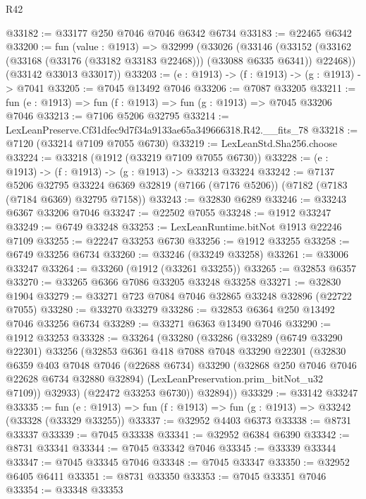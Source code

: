 \begin{lexlean}{R42}
\begin{coremodule}
{@33182 := @33177 @250 @7046 @7046 @6342 @6734
@33183 := @22465 @6342
@33200 := fun (value : @1913) =>
  @32999
    (@33026
      (@33146
        (@33152 (@33162 (@33168 (@33176 (@33182 @33183 @22468))) (@33088 @6335 @6341)) @22468))
      (@33142 @33013 @33017))
@33203 := (e : @1913) -> (f : @1913) -> (g : @1913) -> @7041
@33205 := @7045 @13492 @7046
@33206 := @7087 @33205
@33211 := fun (e : @1913) => fun (f : @1913) => fun (g : @1913) => @7045 @33206 @7046
@33213 := @7106 @5206 @32795
@33214 := LexLeanPreserve.Cf31dfec9d7f34a9133ae65a349666318.R42.__fits_78
@33218 := @7120 (@33214 @7109 @7055 @6730)
@33219 := LexLeanStd.Sha256.choose
@33224 := @33218 (@1912 (@33219 @7109 @7055 @6730))
@33228 := (e : @1913) -> (f : @1913) -> (g : @1913) -> @33213 @33224
@33242 := @7137
    @5206
    @32795
    @33224
    @6369
    @32819
    (@7166 (@7176 @5206))
    (@7182 (@7183 (@7184 @6369) @32795 @7158))
@33243 := @32830 @6289
@33246 := @33243 @6367 @33206 @7046
@33247 := @22502 @7055
@33248 := @1912 @33247
@33249 := @6749 @33248
@33253 := LexLeanRuntime.bitNot @1913 @22246 @7109
@33255 := @22247 @33253 @6730
@33256 := @1912 @33255
@33258 := @6749 @33256 @6734
@33260 := @33246 (@33249 @33258)
@33261 := @33006 @33247
@33264 := @33260 (@1912 (@33261 @33255))
@33265 := @32853 @6357
@33270 := @33265 @6366 @7086 @33205 @33248 @33258
@33271 := @32830 @1904
@33279 := @33271 @723 @7084 @7046 @32865 @33248 @32896 (@22722 @7055)
@33280 := @33270 @33279
@33286 := @32853 @6364 @250 @13492 @7046 @33256 @6734
@33289 := @33271 @6363 @13490 @7046
@33290 := @1912 @33253
@33328 := @33264
    (@33280
      (@33286
        (@33289
          (@6749 @33290 @22301)
          @33256
          (@32853
            @6361
            @418
            @7088
            @7048
            @33290
            @22301
            (@32830
              @6359
              @403
              @7048
              @7046
              (@22688 @6734)
              @33290
              (@32868 @250 @7046 @7046 @22628 @6734 @32880 @32894)
              (LexLeanPreservation.prim_bitNot_u32 @7109))
            @32933)
          (@22472 @33253 @6730))
        @32894))
@33329 := @33142 @33247
@33335 := fun (e : @1913) => fun (f : @1913) => fun (g : @1913) => @33242 (@33328 (@33329 @33255))
@33337 := @32952 @4403 @6373
@33338 := @8731 @33337
@33339 := @7045 @33338
@33341 := @32952 @6384 @6390
@33342 := @8731 @33341
@33344 := @7045 @33342 @7046
@33345 := @33339 @33344
@33347 := @7045 @33345 @7046
@33348 := @7045 @33347
@33350 := @32952 @6405 @6411
@33351 := @8731 @33350
@33353 := @7045 @33351 @7046
@33354 := @33348 @33353
}
\end{coremodule}
\end{lexlean}
